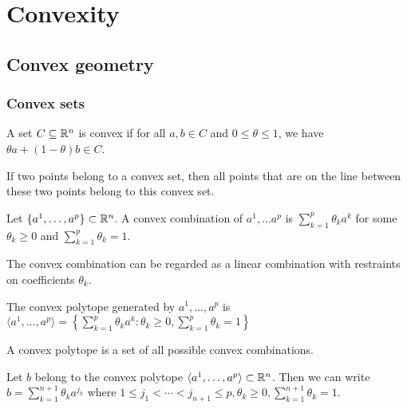 \setchapterpreamble[u]{\margintoc}
\chapter{Convexity}

\section{Convex geometry}

\subsection{Convex sets}

\begin{definition}
A set $C \subseteq \mathbb{R}^n$ is convex if for all $a, b \in C$ and $0 \le \theta \le 1$, we have $\theta a + (1-\theta) b \in C$.
\end{definition}

If two points belong to a convex set, then all points that are on the line between these two points belong to this convex set.

\begin{definition}
Let $\{ a^1, \dots, a^p \} \subset \mathbb{R}^n$.
A convex combination of $a^1, \dots a^p$ is $\sum _{k=1}^{p} \theta_{k} a^k$ for some $\theta_k \ge 0$ and $\sum _{k=1}^{p} \theta_k = 1$.
\end{definition}

The convex combination can be regarded as a linear combination with restraints on coefficients $\theta_k$.

\begin{definition}
The convex polytope generated by $a^1, \dots, a^p$ is $\langle a^1, \dots, a^p \rangle = \left\{ \sum _{k=1}^{p} \theta_{k} a^k : \theta_k \ge 0, \sum _{k=1}^{p} \theta_k = 1 \right\}$
\end{definition}

A convex polytope is a set of all possible convex combinations.

\begin{theorem}
Let $b$ belong to the convex polytope $\langle a^1, \dots, a^p \rangle \subset \mathbb{R}^n$.
Then we can write $b = \sum _{k=1}^{n+1} \theta_k a^{j_k}$ where $1 \le j_1 < \cdots < j_{n+1} \le p, \theta_k \ge 0, \sum _{k=1}^{n+1} \theta_k = 1$.
\end{theorem}

